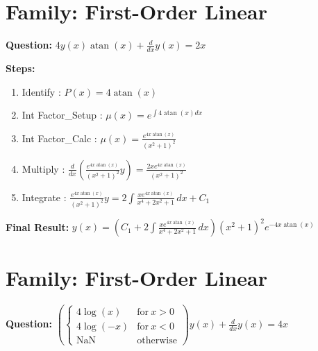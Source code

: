 \documentclass{article}
\begin{document}
\section*{Family: First-Order Linear}
\textbf{Question:} $4 y{\left(x \right)} \operatorname{atan}{\left(x \right)} + \frac{d}{d x} y{\left(x \right)} = 2 x$

\textbf{Steps:}
\begin{enumerate}
\item Identify :  $P(x) = 4 \operatorname{atan}{\left(x \right)}$
\item Int Factor_Setup :  $\mu(x) = e^{\int 4 \operatorname{atan}{\left(x \right)} dx}$
\item Int Factor_Calc :  $\mu(x) = \frac{e^{4 x \operatorname{atan}{\left(x \right)}}}{\left(x^{2} + 1\right)^{2}}$
\item Multiply :  $\frac{d}{dx}(\frac{e^{4 x \operatorname{atan}{\left(x \right)}}}{\left(x^{2} + 1\right)^{2}}y) = \frac{2 x e^{4 x \operatorname{atan}{\left(x \right)}}}{\left(x^{2} + 1\right)^{2}}$
\item Integrate :  $\frac{e^{4 x \operatorname{atan}{\left(x \right)}}}{\left(x^{2} + 1\right)^{2}}y = 2 \int \frac{x e^{4 x \operatorname{atan}{\left(x \right)}}}{x^{4} + 2 x^{2} + 1}\, dx + C_1$
\end{enumerate}
\textbf{Final Result:} $y{\left(x \right)} = \left(C_{1} + 2 \int \frac{x e^{4 x \operatorname{atan}{\left(x \right)}}}{x^{4} + 2 x^{2} + 1}\, dx\right) \left(x^{2} + 1\right)^{2} e^{- 4 x \operatorname{atan}{\left(x \right)}}$

\section*{Family: First-Order Linear}
\textbf{Question:} $\left(\begin{cases} 4 \log{\left(x \right)} & \text{for}\: x > 0 \\4 \log{\left(- x \right)} & \text{for}\: x < 0 \\\text{NaN} & \text{otherwise} \end{cases}\right) y{\left(x \right)} + \frac{d}{d x} y{\left(x \right)} = 4 x$
\end{document}
